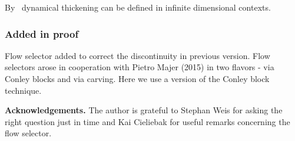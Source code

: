 \documentclass{article}
\theoremstyle{definition}
\theoremstyle{remark}
\renewcommand{\1}{{{\mathchoice {\rm 1\mskip-4mu l} {\rm 1\mskip-4mu l}
{\rm 1\mskip-4.5mu l} {\rm 1\mskip-5mu l}}}}
\newcommand{\N}{{\mathbb{N}}}
\begin{document}
By~\cite{weber:2014c} dynamical thickening
can be defined in infinite dimensional contexts.


\subsubsection*{Added in proof}
Flow selector added
to correct the discontinuity in previous version.
Flow selectors arose in cooperation with 
Pietro Majer (2015) in two flavors - via Conley blocks
and via carving. Here we use a version of the
Conley block technique.


\vspace{.1cm}
\noindent
{\small\bf Acknowledgements.} {\small
The author is grateful to %
Stephan Weis for asking the right question just in time
and Kai Cieliebak for useful remarks concerning the flow selector.
}




{}

%



%
%
\end{document}
